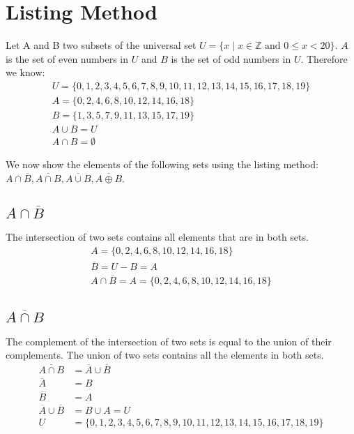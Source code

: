 \documentclass[a4paper,11pt]{scrartcl}
\begin{document}
\section{Listing Method}
Let A and B two subsets of the universal set \( U = \{x \mid x \in \mathbb{Z} \textrm{ and } 0 \leq x < 20 \} \). \(A\) is the set of even numbers in \(U\) and \(B\) is the set of odd numbers in \(U\). Therefore we know:
\begin{gather*}
U = \{0, 1,2,3,4,5,6,7,8,9,10,11,12,13,14,15,16,17,18,19\}\\
  A = \{ 0,2,4,6,8,10,12,14,16,18 \} \\
  B = \{ 1,3,5,7,9,11,13,15,17,19\} \\
  A \cup B = U \\
  A \cap B = \emptyset
\end{gather*}

We now show the elements of the following sets using the listing method: \(A \cap \overline{B}, \overline{A \cap B}, \overline{A \cup B}, \overline{A \oplus B}\).

\subsection{\(A \cap \overline{B}\)} The intersection of two sets contains all elements that are in both sets.
\begin{gather*}
  A = \{0,2,4,6,8,10,12,14,16,18 \} \\
  \overline{B} = U - B = A  \\
  A \cap \overline{B} = A = \{0,2,4,6,8,10,12,14,16,18\}
\end{gather*}

\subsection{\(\overline{A \cap B}\)} The complement of the intersection of two sets is equal to the union of their complements. The union of two sets contains all the elements in both sets.
\begin{align*}
  \overline{A \cap B} &= \overline{A} \cup \overline{B} \tag{De Morgan's Second Law}\\
  \overline{A} &= B \\
  \overline{B} &= A \\
  \overline{A} \cup \overline{B} &= B \cup A = U \\
U &= \{ 0, 1,2,3,4,5,6,7,8,9,10,11,12,13,14,15,16,17,18,19\} \\
\end{align*}
\end{document}
